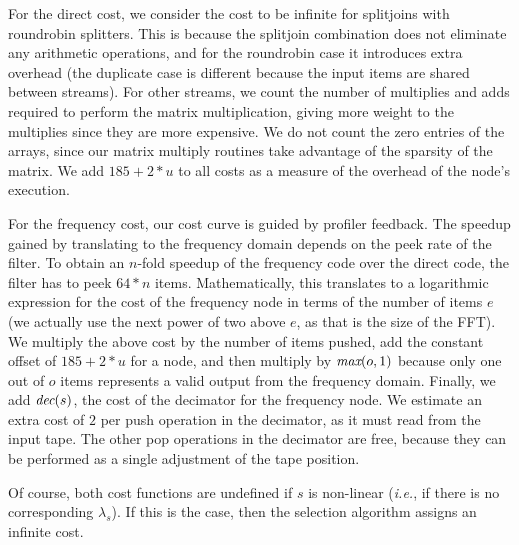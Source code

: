 For the direct cost, we consider the cost to be infinite for
splitjoins with roundrobin splitters.  This is because the splitjoin
combination does not eliminate any arithmetic operations, and for the
roundrobin case it introduces extra overhead (the duplicate case is
different because the input items are shared between streams).  For
other streams, we count the number of multiplies and adds required to
perform the matrix multiplication, giving more weight to the
multiplies since they are more expensive.  We do not count the zero
entries of the arrays, since our matrix multiply routines take
advantage of the sparsity of the matrix.  We add $185+2*u$ to all
costs as a measure of the overhead of the node's execution.

For the frequency cost, our cost curve is guided by profiler feedback.
The speedup gained by translating to the frequency domain depends on
the peek rate of the filter.  To obtain an $n$-fold speedup of the
frequency code over the direct code, the filter has to peek $64*n$
items.  Mathematically, this translates to a logarithmic expression
for the cost of the frequency node in terms of the number of items $e$
(we actually use the next power of two above $e$, as that is the size
of the FFT).  We multiply the above cost by the number of items pushed,
add the constant offset of $185+2*u$ for a node, and then multiply by
$\mbox{\it max}(o, 1)$ because only one out of $o$ items represents a valid
output from the frequency domain.  Finally, we add $\mbox{\it dec}(s)$, the
cost of the decimator for the frequency node.  We estimate an extra
cost of $2$ per push operation in the decimator, as it must read from
the input tape.  The other pop operations in the decimator are free,
because they can be performed as a single adjustment of the tape
position.

Of course, both cost functions are undefined if $s$ is non-linear
({\it i.e.}, if there is no corresponding $\lambda_s$). If this is the
case, then the selection algorithm assigns an infinite cost.


